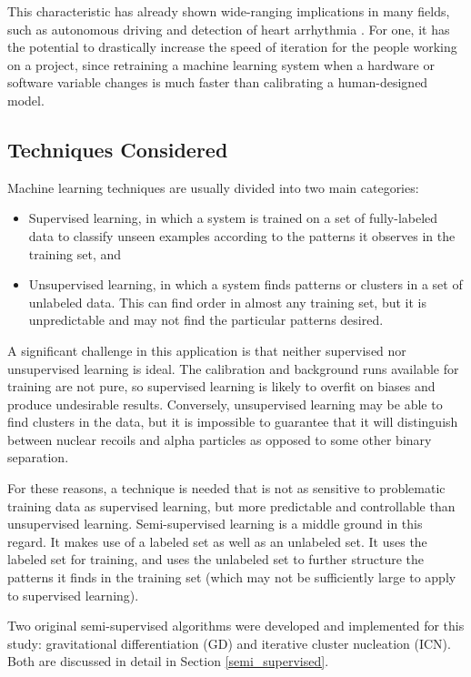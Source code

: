 \documentclass[10pt]{article}
\begin{document}
This characteristic has already shown wide-ranging implications in many fields, such as autonomous driving \cite{end-to-end} and detection of heart arrhythmia \cite{arrhythmia}. For one, it has the potential to drastically increase the speed of iteration for the people working on a project, since retraining a machine learning system when a hardware or software variable changes is much faster than calibrating a human-designed model.

\subsection{Techniques Considered}

Machine learning techniques are usually divided into two main categories:

\begin{itemize}
    \item Supervised learning, in which a system is trained on a set of fully-labeled data to classify unseen examples according to the patterns it observes in the training set, and
    \item Unsupervised learning, in which a system finds patterns or clusters in a set of unlabeled data. This can find order in almost any training set, but it is unpredictable and may not find the particular patterns desired.
\end{itemize}

A significant challenge in this application is that neither supervised nor unsupervised learning is ideal. The calibration and background runs available for training are not pure, so supervised learning is likely to overfit on biases and produce undesirable results. Conversely, unsupervised learning may be able to find clusters in the data, but it is impossible to guarantee that it will distinguish between nuclear recoils and alpha particles as opposed to some other binary separation.

For these reasons, a technique is needed that is not as sensitive to problematic training data as supervised learning, but more predictable and controllable than unsupervised learning. Semi-supervised learning is a middle ground in this regard. It makes use of a labeled set as well as an unlabeled set. It uses the labeled set for training, and uses the unlabeled set to further structure the patterns it finds in the training set (which may not be sufficiently large to apply to supervised learning).

Two original semi-supervised algorithms were developed and implemented for this study: gravitational differentiation (GD) and iterative cluster nucleation (ICN). Both are discussed in detail in Section \ref{semi_supervised}.
\end{document}

